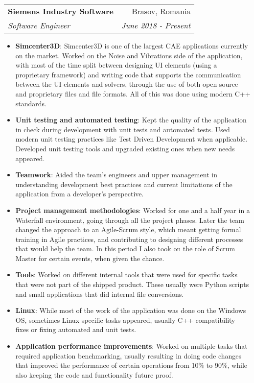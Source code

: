 \documentclass[letterpaper,11pt]{article}
\makeatletter
\newcommand{\resumeItem}[2]{
  \item\small{
    \textbf{#1}{: #2 \vspace{-2pt}}
  }
}
\newcommand{\resumeSubheading}[4]{
  \vspace{-1pt}\item
    \begin{tabular*}{0.97\textwidth}[t]{l@{\extracolsep{\fill}}r}
      \textbf{#1} & #2 \\
      \textit{\small#3} & \textit{\small #4} \\
    \end{tabular*}\vspace{-5pt}
}
\newcommand{\resumeSubSubheading}[2]{
    \begin{tabular*}{0.97\textwidth}{l@{\extracolsep{\fill}}r}
      \textit{\small#1} & \textit{\small #2} \\
    \end{tabular*}\vspace{-5pt}
}
\newcommand{\resumeSubHeadingListEnd}{\end{itemize}}
\newcommand{\resumeItemListStart}{\begin{itemize}}
\newcommand{\resumeItemListEnd}{\end{itemize}\vspace{-5pt}}
\makeatother
\begin{document}
    \resumeSubheading
      {Siemens Industry Software}{Brasov, Romania}
      {Software Engineer}{June 2018 - Present}
      \resumeItemListStart
        \resumeItem{Simcenter3D}
          {Simcenter3D is one of the largest CAE applications currently on the market. Worked on the Noise and Vibrations side of the application, with most of the time split between designing UI elements (using a proprietary framework) and writing code that supports the communication between the UI elements and solvers, through the use of both open source and proprietary files and file formats. All of this was done using modern C++ standards.}
        \resumeItem{Unit testing and automated testing}
          {Kept the quality of the application in check during development with unit tests and automated tests. Used modern unit testing practices like Test Driven Development when applicable. Developed unit testing tools and upgraded existing ones when new needs appeared.}
        \resumeItem{Teamwork}
          {Aided the team's engineers and upper management in understanding development best practices and current limitations of the application from a developer's perspective.}
        \resumeItem{Project management methodologies}
          {Worked for one and a half year in a Waterfall environment, going through all the project phases. Later the team changed the approach to an Agile-Scrum style, which meant getting formal training in Agile practices, and contributing to designing different processes that would help the team. In this period I also took on the role of Scrum Master for certain events, when given the chance.}
        \resumeItem{Tools}
          {Worked on different internal tools that were used for specific tasks that were not part of the shipped product. These usually were Python scripts and small applications that did internal file conversions.}
        \resumeItem{Linux}
          {While most of the work of the application was done on the Windows OS, sometimes Linux specific tasks appeared, usually C++ compatibility fixes or fixing automated and unit tests.}
        \resumeItem{Application performance improvements}
          {Worked on multiple tasks that required application benchmarking, usually resulting in doing code changes that improved the performance of certain operations from 10\% to 90\%, while also keeping the code and functionality future proof.}
      \resumeItemListEnd
      
\end{document}
